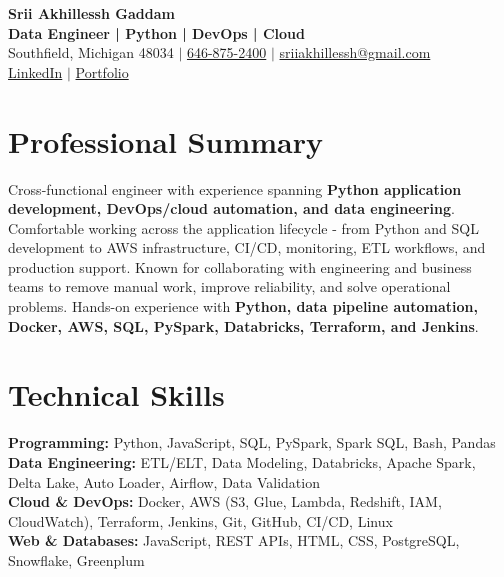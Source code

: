 \documentclass[letterpaper,10pt]{article}
\begin{document}
\fontsize{9.35pt}{10.45pt}\selectfont

\begin{center}
    {\LARGE \textbf{Srii Akhillessh Gaddam}} \\[-1pt]
    \textbf{Data Engineer | Python | DevOps | Cloud} \\[2pt]
    Southfield, Michigan 48034 $|$
    \href{tel:6468752400}{646-875-2400} $|$
    \href{mailto:sriiakhillessh@gmail.com}{sriiakhillessh@gmail.com} \\[1pt]
    \href{https://www.linkedin.com/in/srii-akhiilessh-gaddam-b48668191/}{LinkedIn} $|$
    \href{https://sriiakhillesshg.github.io/portfolio/}{Portfolio}
\end{center}
\vspace{-8pt}

\section{Professional Summary}
\small{Cross-functional engineer with experience spanning \textbf{Python application development, DevOps/cloud automation, and data engineering}. Comfortable working across the application lifecycle - from Python and SQL development to AWS infrastructure, CI/CD, monitoring, ETL workflows, and production support. Known for collaborating with engineering and business teams to remove manual work, improve reliability, and solve operational problems. Hands-on experience with \textbf{Python, data pipeline automation, Docker, AWS, SQL, PySpark, Databricks, Terraform, and Jenkins}.}

\section{Technical Skills}
\small{
\textbf{Programming:} Python, JavaScript, SQL, PySpark, Spark SQL, Bash, Pandas \\
\textbf{Data Engineering:} ETL/ELT, Data Modeling, Databricks, Apache Spark, Delta Lake, Auto Loader, Airflow, Data Validation \\
\textbf{Cloud \& DevOps:} Docker, AWS (S3, Glue, Lambda, Redshift, IAM, CloudWatch), Terraform, Jenkins, Git, GitHub, CI/CD, Linux \\
\textbf{Web \& Databases:} JavaScript, REST APIs, HTML, CSS, PostgreSQL, Snowflake, Greenplum
}

\end{document}
